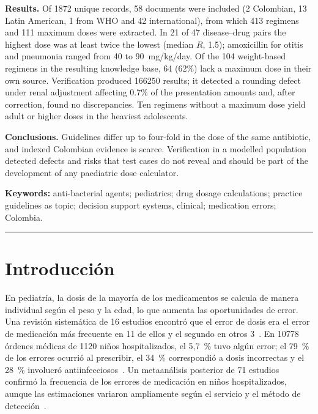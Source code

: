 \documentclass[11pt,a4paper]{article}
\begin{document}
\noindent\textbf{Results.} Of \num{1872} unique records, 58 documents were included (2 Colombian, 13 Latin American, 1 from WHO and 42 international), from which 413 regimens and 111 maximum doses were extracted. In 21 of 47 disease--drug pairs the highest dose was at least twice the lowest (median $R$, 1.5); amoxicillin for otitis and pneumonia ranged from 40 to 90~mg/kg/day. Of the 104 weight-based regimens in the resulting knowledge base, 64 (62\%) lack a maximum dose in their own source. Verification produced \num{166250} results; it detected a rounding defect under renal adjustment affecting 0.7\% of the presentation amounts and, after correction, found no discrepancies. Ten regimens without a maximum dose yield adult or higher doses in the heaviest adolescents.

\noindent\textbf{Conclusions.} Guidelines differ up to four-fold in the dose of the same antibiotic, and indexed Colombian evidence is scarce. Verification in a modelled population detected defects and risks that test cases do not reveal and should be part of the development of any paediatric dose calculator.

\noindent\textbf{Keywords:} anti-bacterial agents; pediatrics; drug dosage calculations; practice guidelines as topic; decision support systems, clinical; medication errors; Colombia.

\vspace{4pt}
\noindent\rule{\textwidth}{0.4pt}

\section{Introducción}

En pediatría, la dosis de la mayoría de los medicamentos se calcula de manera individual según el peso y la edad, lo que aumenta las oportunidades de error. Una revisión sistemática de 16 estudios encontró que el error de dosis era el error de medicación más frecuente en 11 de ellos y el segundo en otros 3~\citep{wong2004}. En \num{10778} órdenes médicas de \num{1120} niños hospitalizados, el 5,7~\% tuvo algún error; el 79~\% de los errores ocurrió al prescribir, el 34~\% correspondió a dosis incorrectas y el 28~\% involucró antiinfecciosos~\citep{kaushal2001}. Un metaanálisis posterior de 71 estudios confirmó la frecuencia de los errores de medicación en niños hospitalizados, aunque las estimaciones variaron ampliamente según el servicio y el método de detección~\citep{gates2019}.
\end{document}
